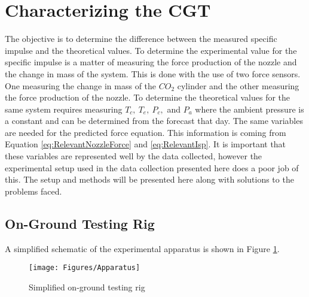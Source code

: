 \section{Characterizing the CGT}
The objective is to determine the difference between the measured specific impulse and the theoretical values. To determine the experimental value for the specific impulse is a matter of measuring the force production of the nozzle and the change in mass of the system. This is done with the use of two force sensors. One measuring the change in mass of the $CO_2$ cylinder and the other measuring the force production of the nozzle. To determine the theoretical values for the same system requires measuring $T_c,\ T_e,\ P_c,$ and $P_a$ where the ambient pressure is a constant and can be determined from the forecast that day. The same variables are needed for the predicted force equation. This information is coming from Equation \ref{eq:RelevantNozzleForce} and \ref{eq:RelevantIsp}. It is important that these variables are represented well by the data collected, however the experimental setup used in the data collection presented here does a poor job of this. The setup and methods will be presented here along with solutions to the problems faced. 
\subsection{On-Ground Testing Rig}
A simplified schematic of the experimental apparatus is shown in Figure \ref{fig:ApparatusSchem}.
\begin{figure}[h!]
\centering
\texttt{[image: Figures/Apparatus]}
\caption{Simplified on-ground testing rig}
\label{fig:ApparatusSchem}
\end{figure}
